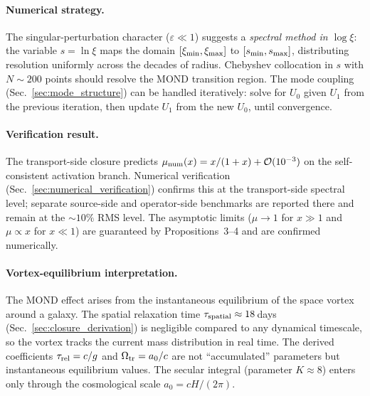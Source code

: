 \documentclass[11pt]{article}
\begin{document}
\paragraph{Numerical strategy.}
The singular-perturbation character ($\varepsilon \ll 1$)
suggests a \emph{spectral method in $\log\xi$}:
the variable $s = \ln\xi$ maps the domain
$[\xi_{\rm min},\xi_{\rm max}]$ to
$[s_{\rm min},s_{\rm max}]$, distributing resolution
uniformly across the decades of radius.
Chebyshev collocation in $s$ with $N \sim 200$ points
should resolve the MOND transition region.
The mode coupling (Sec.~\ref{sec:mode_structure})
can be handled iteratively: solve for $U_0$ given
$U_1$ from the previous iteration, then update $U_1$
from the new $U_0$, until convergence.

\paragraph{Verification result.}
The transport-side closure predicts
$\mu_{\rm num}(x) = x/(1+x) + \mathcal{O}(10^{-3})$
on the self-consistent activation branch.
Numerical verification (Sec.~\ref{sec:numerical_verification})
confirms this at the transport-side spectral level; separate
source-side and operator-side benchmarks are reported there and
remain at the $\sim10\%$ RMS level.
The asymptotic limits ($\mu \to 1$ for $x \gg 1$ and
$\mu \propto x$ for $x \ll 1$) are guaranteed by
Propositions~3--4 and are confirmed numerically.

\paragraph{Vortex-equilibrium interpretation.}
\label{sec:steady_state_caveat}
The MOND effect arises from the instantaneous equilibrium
of the space vortex around a galaxy.  The spatial
relaxation time $\tau_{\rm spatial}\approx 18\,$days
(Sec.~\ref{sec:closure_derivation}) is negligible
compared to any dynamical timescale, so the vortex
tracks the current mass distribution in real time.
The derived coefficients $\tau_{\rm rel} = c/g$ and
$\Omega_{\rm tr} = a_0/c$ are not ``accumulated''
parameters but instantaneous equilibrium values.
The secular integral (parameter $K\approx 8$) enters
only through the cosmological scale $a_0=cH/(2\pi)$.

\end{document}
